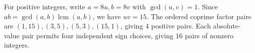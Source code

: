 For positive integers, write $a=8u,b=8v$ with $\gcd(u,v)=1$. Since $ab=\gcd(a,b)\operatorname{lcm}(a,b)$, we have $uv=15$. The ordered coprime factor pairs are $(1,15),(3,5),(5,3),(15,1)$, giving $\boxed{4}$ positive pairs. Each absolute-value pair permits four independent sign choices, giving $\boxed{16}$ pairs of nonzero integers.
